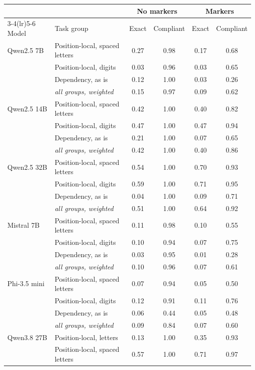 \begin{tabular}{ll cc cc}
\toprule
& & \multicolumn{2}{c}{No markers} & \multicolumn{2}{c}{Markers} \\
\cmidrule(lr){3-4}\cmidrule(lr){5-6}
Model & Task group & Exact & Compliant & Exact & Compliant \\
\midrule
Qwen2.5 7B & Position-local, spaced letters & 0.27 & 0.98 & 0.17 & 0.68 \\
 & Position-local, digits & 0.03 & 0.96 & 0.03 & 0.65 \\
 & Dependency, as is & 0.12 & 1.00 & 0.03 & 0.26 \\
 & \emph{all groups, weighted} & 0.15 & 0.97 & 0.09 & 0.62 \\
\midrule
Qwen2.5 14B & Position-local, spaced letters & 0.42 & 1.00 & 0.40 & 0.82 \\
 & Position-local, digits & 0.47 & 1.00 & 0.47 & 0.94 \\
 & Dependency, as is & 0.21 & 1.00 & 0.07 & 0.65 \\
 & \emph{all groups, weighted} & 0.42 & 1.00 & 0.40 & 0.86 \\
\midrule
Qwen2.5 32B & Position-local, spaced letters & 0.54 & 1.00 & 0.70 & 0.93 \\
 & Position-local, digits & 0.59 & 1.00 & 0.71 & 0.95 \\
 & Dependency, as is & 0.04 & 1.00 & 0.09 & 0.71 \\
 & \emph{all groups, weighted} & 0.51 & 1.00 & 0.64 & 0.92 \\
\midrule
Mistral 7B & Position-local, spaced letters & 0.11 & 0.98 & 0.10 & 0.55 \\
 & Position-local, digits & 0.10 & 0.94 & 0.07 & 0.75 \\
 & Dependency, as is & 0.03 & 0.95 & 0.01 & 0.28 \\
 & \emph{all groups, weighted} & 0.10 & 0.96 & 0.07 & 0.61 \\
\midrule
Phi-3.5 mini & Position-local, spaced letters & 0.07 & 0.94 & 0.05 & 0.50 \\
 & Position-local, digits & 0.12 & 0.91 & 0.11 & 0.76 \\
 & Dependency, as is & 0.06 & 0.44 & 0.05 & 0.48 \\
 & \emph{all groups, weighted} & 0.09 & 0.84 & 0.07 & 0.60 \\
\midrule
Qwen3.8 27B & Position-local, letters & 0.13 & 1.00 & 0.35 & 0.93 \\
 & Position-local, spaced letters & 0.57 & 1.00 & 0.71 & 0.97 \\

\end{tabular}
